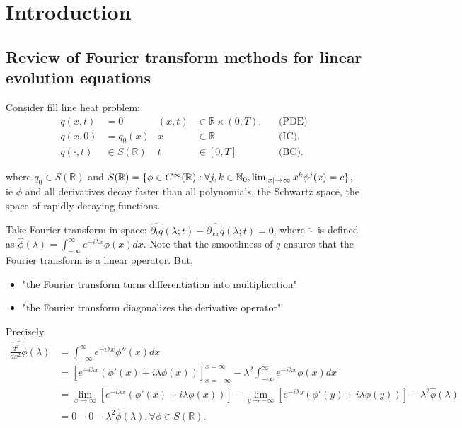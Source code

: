 \section*{Introduction}

\subsection{Review of Fourier transform methods for linear evolution equations}

Consider fill line heat problem:
\begin{align*}
[\partial_t- \partial_{xx}]q(x,t) &= 0 &(x,t) &\in \mathbb{R} \times (0,T),&  &\text{(PDE)}\\
q(x,0) &= q_0(x) & x &\in \mathbb{R}& &\text{(IC)},\\
q(\cdot,t) &\in S(\mathbb{R}) & t &\in [0,T] & &\text{(BC)}. 
\end{align*}

where $q_0 \in S(\mathbb{R})$ and $S(\mathbb{R}) = \{\phi \in  C^\infty(\mathbb{R}) : \forall j, k \in \mathbb{N}_0, \lim_{\left\lvert x\right\rvert \to \infty} x^k\phi^j(x) = c\}$, ie $\phi$ and all derivatives decay faster than all polynomials, the Schwartz space, the space of rapidly decaying functions.

Take Fourier transform in space:
$\widehat{\partial_tq}(\lambda;t) - \widehat{\partial_{xx}q}(\lambda;t) = 0$, where $\widehat{\cdot}$ is defined as $\widehat{\phi}(\lambda) = \int_{-\infty}^{\infty} e^{-i\lambda x}\phi(x) dx$. Note that the smoothness of $q$ ensures that the Fourier transform is a linear operator.
But, 
\begin{itemize}
	\item "the Fourier transform turns differentiation into multiplication"
	\item "the Fourier transform diagonalizes the derivative operator"
\end{itemize}
Precisely,
\begin{align*}
	\widehat{\frac{d^2}{dx^2}\phi}(\lambda) &= \int_{-\infty}^{\infty} e^{-i\lambda x}\phi''(x)dx \\
	&=\left[e^{-i\lambda x}(\phi'(x)+ i\lambda\phi(x)) \right]_{x=-\infty}^{x=\infty} - \lambda^2\int_{-\infty}^{\infty}e^{-i\lambda x}\phi(x)dx\\
	&=\lim_{x \to \infty}\left[e^{-i\lambda x}(\phi'(x)+ i\lambda\phi(x)) \right] - \lim_{y \to -\infty}\left[e^{-i\lambda y}(\phi'(y)+ i\lambda\phi(y)) \right] - \lambda^2\widehat{\phi}(\lambda)\\
	& = 0 - 0 - \lambda^2\widehat{\phi}(\lambda), \forall \phi \in S(\mathbb{R}).
\end{align*}

